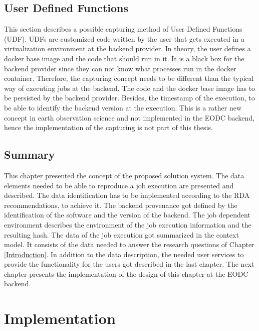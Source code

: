 \documentclass[draft,final]{vutinfth} %
\begin{document}
\section{User Defined Functions}\label{Design:User Defined Functions}
This section describes a possible capturing method of User Defined Functions (UDF). UDFs are customized code written by the user that gets executed in a virtualization environment at the backend provider. In theory, the user defines a docker base image and the code that should run in it. It is a black box for the backend provider since they can not know what processes run in the docker container. Therefore, the capturing concept needs to be different than the typical way of executing jobs at the backend. The code and the docker base image has to be persisted by the backend provider. Besides, the timestamp of the execution, to be able to identify the backend version at the execution. This is a rather new concept in earth observation science and not implemented in the EODC backend, hence the implementation of the capturing is not part of this thesis.

\section{Summary}
This chapter presented the concept of the proposed solution system. The data elements needed to be able to reproduce a job execution are presented and described. The data identification has to be implemented according to the RDA recommendations, to achieve it. The backend provenance got defined by the identification of the software and the version of the backend. The job dependent environment describes the environment of the job execution information and the resulting hash. The data of the job execution got summarized in the context model. It consists of the data needed to answer the research questions of Chapter \ref{Introduction}. In addition to the data description, the needed user services to provide the functionality for the users got described in the last chapter. The next chapter presents the implementation of the design of this chapter at the EODC backend.    

\chapter{Implementation}\label{Implementation}
\end{document}
